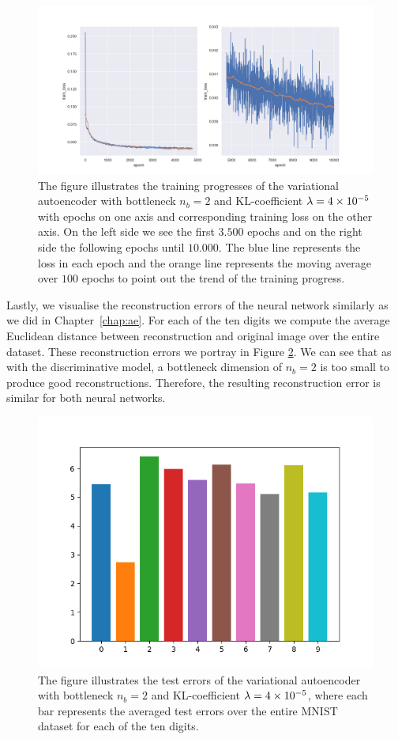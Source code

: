 \begin{figure}
\begin{center}
\includegraphics[width=\linewidth]{convolutional_VAE_snd_KL_4e-5_10k_epochs_2D_training_progress}
\end{center}
\caption{The figure illustrates the training progresses of the variational autoencoder with bottleneck $n_b=2$ and KL-coefficient $\lambda = \num{4e-5}$ with epochs on one axis and corresponding training loss on the other axis. On the left side we see the first $3.500$ epochs and on the right side the following epochs until $10.000$. The blue line represents the loss in each epoch and the orange line represents the moving average over $100$ epochs to point out the trend of the training progress.}\label{fig:convolutional_VAE_snd_KL_4e-5_10k_epochs_2D_training_progress}
\end{figure}


Lastly, we visualise the reconstruction errors of the neural network similarly as we did in Chapter~\ref{chap:ae}. For each of the ten digits we compute the average Euclidean distance between reconstruction and original image over the entire dataset. These reconstruction errors we portray in Figure \ref{fig:convolutional_VAE_snd_KL_4e-5_10k_epochs_2D_errors}. We can see that as with the discriminative model, a bottleneck dimension of $n_b=2$ is too small to produce good reconstructions. Therefore, the resulting reconstruction error is similar for both neural networks.


\begin{figure}
\begin{center}
      \includegraphics[width=0.49\linewidth]{convolutional_VAE_snd_KL_4e-5_10k_epochs_2D_errors}
\end{center}
\caption{The figure illustrates the test errors of the variational autoencoder with bottleneck $n_b=2$ and KL-coefficient $\lambda = \num{4e-5}$, where each bar represents the averaged test errors over the entire MNIST dataset for each of the ten digits.}\label{fig:convolutional_VAE_snd_KL_4e-5_10k_epochs_2D_errors}
\end{figure}


